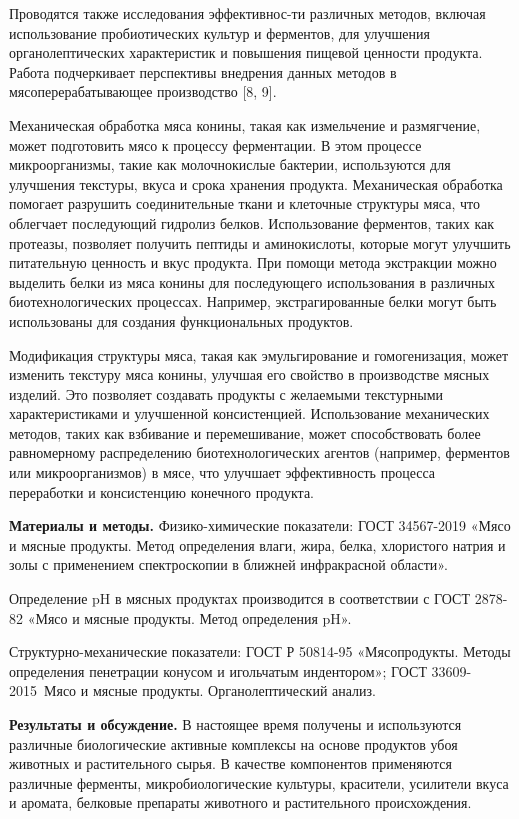 \begin{multicols}{2}
Проводятся также исследования эффективнос-ти различных методов, включая
использование пробиотических культур и ферментов, для улучшения
органолептических характеристик и повышения пищевой ценности продукта.
Работа подчеркивает перспективы внедрения данных методов в
мясоперерабатывающее производство {[}8, 9{]}.

Механическая обработка мяса конины, такая как измельчение и размягчение,
может подготовить мясо к процессу ферментации. В этом процессе
микроорганизмы, такие как молочнокислые бактерии, используются для
улучшения текстуры, вкуса и срока хранения продукта. Механическая
обработка помогает разрушить соединительные ткани и клеточные структуры
мяса, что облегчает последующий гидролиз белков. Использование
ферментов, таких как протеазы, позволяет получить пептиды и
аминокислоты, которые могут улучшить питательную ценность и вкус
продукта. При помощи метода экстракции можно выделить белки из мяса
конины для последующего использования в различных биотехнологических
процессах. Например, экстрагированные белки могут быть использованы для
создания функциональных продуктов.

Модификация структуры мяса, такая как эмульгирование и гомогенизация,
может изменить текстуру мяса конины, улучшая его свойство в производстве
мясных изделий. Это позволяет создавать продукты с желаемыми текстурными
характеристиками и улучшенной консистенцией. Использование механических
методов, таких как взбивание и перемешивание, может способствовать более
равномерному распределению биотехнологических агентов (например,
ферментов или микроорганизмов) в мясе, что улучшает эффективность
процесса переработки и консистенцию конечного продукта.

{\bfseries Материалы и методы.} Физико-химические показатели: ГОСТ
34567-2019 «Мясо и мясные продукты. Метод определения влаги, жира,
белка, хлористого натрия и золы с применением спектроскопии в ближней
инфракрасной области».

Определение pH в мясных продуктах производится в соответствии с ГОСТ
2878-82 «Мясо и мясные продукты. Метод определения pH».

Структурно-механические показатели: ГОСТ Р 50814-95 «Мясопродукты.
Методы определения пенетрации конусом и игольчатым индентором»; ГОСТ
33609-2015~Мясо и мясные продукты. Органолептический анализ.

{\bfseries Результаты и обсуждение.} В настоящее время получены и
используются различные биологические активные комплексы на основе
продуктов убоя животных и растительного сырья. В качестве компонентов
применяются различные ферменты, микробиологические культуры, красители,
усилители вкуса и аромата, белковые препараты животного и растительного
происхождения.


\end{multicols}
